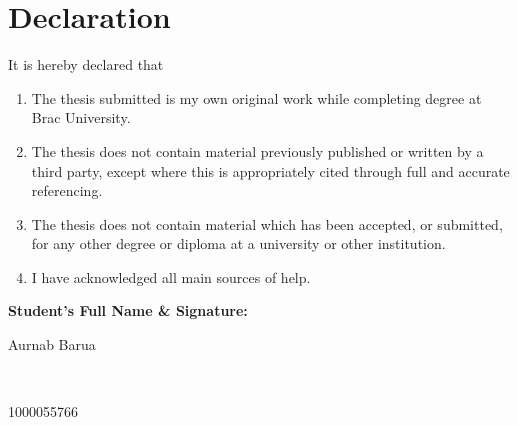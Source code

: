 \newcommand*\wildcard[2][6cm]{\vspace{2cm}\parbox{#1}{\hrulefill\par#2}} 


\section*{Declaration}

It is hereby declared that

\begin{enumerate} %
  \item The thesis submitted is my own original work while completing degree at Brac University.
  \item The thesis does not contain material previously published or written by a third party, except where this is appropriately cited through full and accurate referencing.
  \item The thesis does not contain material which has been accepted, or submitted, for any other degree or diploma at a university or other institution.
  \item I have acknowledged all main sources of help.
\end{enumerate}

\vspace{1cm}
\textbf{Student’s Full Name \& Signature:} %

\begingroup

    \begin{center}
        \wildcard{\centerline{Aurnab Barua} ~\\ \centerline{1000055766}} %
        \hspace{2cm} %
       
    \end{center}

\endgroup


\pagebreak





